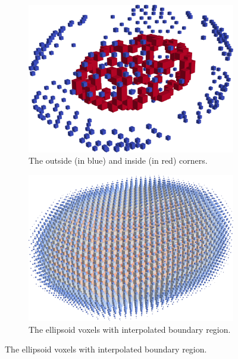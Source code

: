 \documentclass[a4paper,10pt]{report}
\begin{document}
\begin{figure}[H]
    \centering
    \begin{subfigure}{.32\textwidth}
        \includegraphics[width=\textwidth]{../images/3D/Ellipsoid_blocks_isolated_vertices_5.png}
    \caption{The outside (in blue) and inside (in red) corners.}
    \label{fig:Ellipsoid_blocks_isolated_vertices_5}
    \end{subfigure}
    \hfill
    \begin{subfigure}{.32\textwidth}
        \includegraphics[width=\textwidth]{../images/3D/Ellipsoid_blocks_isolated_vertices_interpolated_5.png}
    \caption{The ellipsoid voxels with interpolated boundary region.}
    \label{fig:Ellipsoid_blocks_isolated_vertices_interpolated_5}
    \end{subfigure}

\end{figure}
\end{document}
